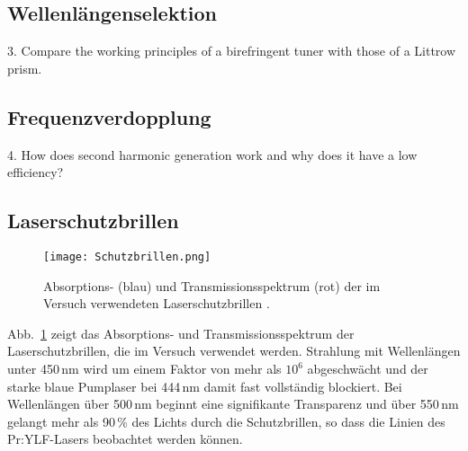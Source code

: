 \subsection{Wellenlängenselektion}


3. Compare the working principles of a birefringent tuner with those of a Littrow prism.


\subsection{Frequenzverdopplung}

4. How does second harmonic generation work and why does it have a low
efficiency?



\subsection{Laserschutzbrillen}

\begin{figure}[H]
\begin{center}
  \texttt{[image: Schutzbrillen.png]}
  \caption{Absorptions- (blau)  und Transmissionsspektrum (rot) der im Versuch
  verwendeten Laserschutzbrillen \cite{Versuchsanleitung}.}
  \label{img:Schutzbrillen}
\end{center}
\end{figure}

Abb.~\ref{img:Schutzbrillen} zeigt das Absorptions- und Transmissionsspektrum der
Laserschutzbrillen, die im Versuch verwendet werden.
Strahlung mit Wellenlängen unter 450\,nm wird um einem Faktor von mehr als $10^6$ abgeschwächt und
der starke blaue Pumplaser bei 444\,nm damit fast vollständig blockiert.
Bei Wellenlängen über 500\,nm beginnt eine signifikante Transparenz und über 550\,nm gelangt mehr
als 90\,\% des Lichts durch die Schutzbrillen,
so dass die Linien des Pr:YLF-Lasers beobachtet werden können.

